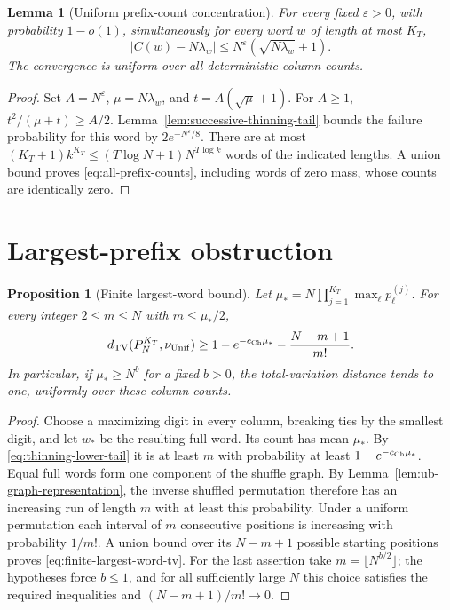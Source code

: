 \documentclass[11pt]{article}
\numberwithin{equation}{section}
\newtheorem{proposition}[proposition]{Proposition}
\newtheorem{lemma}[lemma]{Lemma}
\newcommand{\TV}{\mathrm{TV}}
\newcommand{\Unif}{\mathrm{Unif}}
\newcommand{\1}{\mathbf 1}
\newcommand{\nuUnif}{\nu_{\Unif}}
\begin{document}
\begin{lemma}[Uniform prefix-count concentration]
\label{cor:iterated-hypergeom}
For every fixed \(\varepsilon>0\), with probability \(1-o(1)\),
simultaneously for every word \(w\) of length at most \(K_T\),
\begin{equation}
\label{eq:all-prefix-counts}
 |C(w)-N\lambda_w|\le
 N^\varepsilon(\sqrt{N\lambda_w}+1).
\end{equation}
The convergence is uniform over all deterministic column counts.
\end{lemma}

\begin{proof}
Set \(A=N^\varepsilon\), \(\mu=N\lambda_w\), and
\(t=A(\sqrt\mu+1)\). For \(A\ge1\),
\(t^2/(\mu+t)\ge A/2\).
Lemma~\ref{lem:successive-thinning-tail} bounds the failure probability
for this word by \(2e^{-N^\varepsilon/8}\).
There are at most \((K_T+1)k^{K_T}\le (T\log N+1)N^{T\log k}\)
words of the indicated lengths. A union bound proves
\eqref{eq:all-prefix-counts}, including words of zero mass, whose counts
are identically zero.
\end{proof}

\section{Largest-prefix obstruction}

\begin{proposition}[Finite largest-word bound]
\label{prop:largest-prefix}
Let
\(\mu_*=N\prod_{j=1}^{K_T}\max_\ell p^{(j)}_\ell\).
For every integer \(2\le m\le N\) with \(m\le\mu_*/2\),
\begin{equation}
\label{eq:finite-largest-word-tv}
 d_{\TV}(P_N^{K_T},\nuUnif)
 \ge1-e^{-c_{\rm Ch}\mu_*}-\frac{N-m+1}{m!}.
\end{equation}
In particular, if \(\mu_*\ge N^b\) for a fixed \(b>0\), the
total-variation distance tends to one, uniformly over these column counts.
\end{proposition}

\begin{proof}
Choose a maximizing digit in every column, breaking ties by the smallest
digit, and let \(w_*\) be the resulting full word. Its count has mean
\(\mu_*\). By \eqref{eq:thinning-lower-tail} it is at least \(m\)
with probability at least \(1-e^{-c_{\rm Ch}\mu_*}\).
Equal full words form one component of the shuffle graph. By
Lemma~\ref{lem:ub-graph-representation}, the inverse shuffled permutation
therefore has an increasing run of length \(m\) with at least this
probability. Under a uniform permutation each interval of \(m\) consecutive
positions is increasing with probability \(1/m!\). A union bound over
its \(N-m+1\) possible starting positions proves
\eqref{eq:finite-largest-word-tv}. For the last assertion take
\(m=\lfloor N^{b/2}\rfloor\); the hypotheses force \(b\le1\), and
for all sufficiently large \(N\) this choice satisfies the required
inequalities and \((N-m+1)/m!\to0\).
\end{proof}
\end{document}
